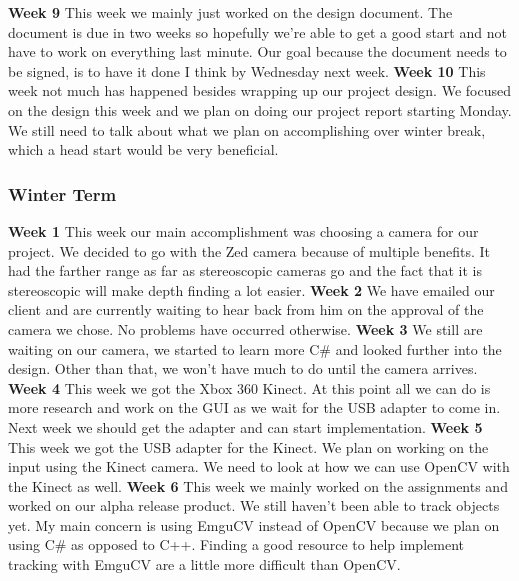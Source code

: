 \documentclass[onecolumn, draftclsnofoot,10pt, compsoc]{IEEEtran}
\begin{document}
\newline
\textbf{Week 9}
\newline
This week we mainly just worked on the design document. The document is due in two weeks so hopefully we're able to get a good start and not have to work on everything last minute. Our goal because the document needs to be signed, is to have it done I think by Wednesday next week.
\newline
\textbf{Week 10}
\newline
This week not much has happened besides wrapping up our project design. We focused on the design this week and we plan on doing our project report starting Monday.
We still need to talk about what we plan on accomplishing over winter break, which a head start would be very beneficial.
\subsubsection{Winter Term}
\textbf{Week 1}
\newline
This week our main accomplishment was choosing a camera for our project. We decided to go with the Zed camera because of multiple benefits. It had the farther range as far as stereoscopic cameras go and the fact that it is stereoscopic will make depth finding a lot easier.
\newline
\textbf{Week 2}
\newline
We have emailed our client and are currently waiting to hear back from him on the approval of the camera we chose. No problems have occurred otherwise.
\newline
\textbf{Week 3}
\newline
We still are waiting on our camera, we started to learn more C\# and looked further into the design. Other than that, we won't have much to do until the camera arrives.
\newline
\textbf{Week 4}
\newline
This week we got the Xbox 360 Kinect. At this point all we can do is more research and work on the GUI as we wait for the USB adapter to come in. Next week we should get the adapter and can start implementation.
\newline
\textbf{Week 5}
\newline
This week we got the USB adapter for the Kinect. We plan on working on the input using the Kinect camera. We need to look at how we can use OpenCV with the Kinect as well.
\newline
\textbf{Week 6}
\newline
This week we mainly worked on the assignments and worked on our alpha release product. We still haven't been able to track objects yet. My main concern is using EmguCV instead of OpenCV because we plan on using C\# as opposed to C++. Finding a good resource to help implement tracking with EmguCV are a little more difficult than OpenCV.
\end{document}
